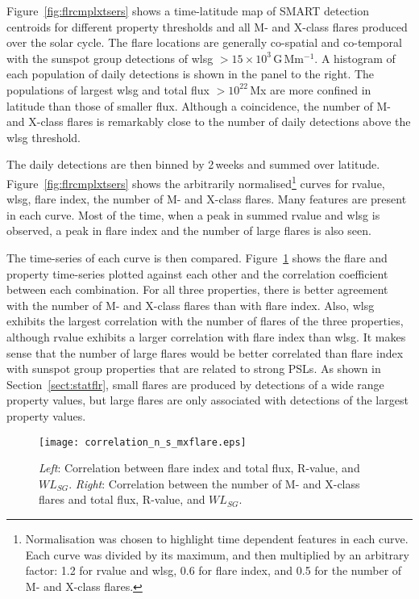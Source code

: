 {%

Figure~\ref{fig:flrcmplxtsers} shows a time-latitude map of \gls{SMART} detection centroids for different property thresholds and all M- and X-class flares produced over the solar cycle. The flare locations are generally co-spatial and co-temporal with the sunspot group detections of \gls{wlsg} $>15\times10^3$\,G\,Mm$^{-1}$. A histogram of each population of daily detections is shown in the panel to the right. The populations of largest \gls{wlsg} and total flux $>10^{22}$\,Mx are more confined in latitude than those of smaller flux. Although a coincidence, the number of M- and X-class flares is remarkably close to the number of daily detections above the \gls{wlsg} threshold.

The daily detections are then binned by 2\,weeks and summed over latitude. Figure~\ref{fig:flrcmplxtsers} shows the arbitrarily normalised\footnote{Normalisation was chosen to highlight time dependent features in each curve. Each curve was divided by its maximum, and then multiplied by an arbitrary factor: 1.2 for \gls{rvalue} and \gls{wlsg}, 0.6 for flare index, and 0.5 for the number of M- and X-class flares.} curves for \gls{rvalue}, \gls{wlsg}, flare index, the number of M- and X-class flares. Many features are present in each curve. Most of the time, when a peak in summed \gls{rvalue} and \gls{wlsg} is observed, a peak in flare index and the number of large flares is also seen.

The time-series of each curve is then compared. Figure~\ref{fig:fltcmplxcorr} shows the flare and property time-series plotted against each other and the correlation coefficient between each combination. For all three properties, there is better agreement with the number of M- and X-class flares than with flare index. Also, \gls{wlsg} exhibits the largest correlation with the number of flares of the three properties, although \gls{rvalue} exhibits a larger correlation with flare index than \gls{wlsg}. It makes sense that the number of large flares would be better correlated than flare index with sunspot group properties that are related to strong \glspl{PSL}. As shown in Section~\ref{sect:statflr}, small flares are produced by detections of a wide range property values, but large flares are only associated with detections of the largest property values.

\begin{landscape}
\begin{figure}[!t]
\centerline{\texttt{[image: correlation\_n\_s\_mxflare.eps]}}
\caption[Correlation between AR property time series and flaring.]{\emph{Left}: Correlation between flare index and total flux, R-value, and $WL_{SG}$. \emph{Right}: Correlation between the number of M- and X-class flares and total flux, R-value, and $WL_{SG}$.}
\label{fig:fltcmplxcorr}
\end{figure}
\end{landscape}

}
